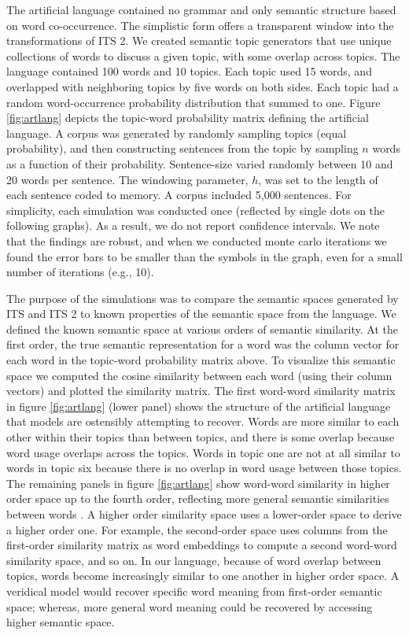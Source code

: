 \documentclass[10pt,letterpaper]{article}
\begin{document}
The artificial language contained no grammar and only semantic structure based on word co-occurrence. The simplistic form offers a transparent window into the transformations of ITS 2. We created semantic topic generators that use unique collections of words to discuss a given topic, with some overlap across topics. The language contained 100 words and 10 topics. Each topic used 15 words, and overlapped with neighboring topics by five words on both sides. Each topic had a random word-occurrence probability distribution that summed to one. Figure \ref{fig:artlang} depicts the topic-word probability matrix defining the artificial language. A corpus was generated by randomly sampling topics (equal probability), and then constructing sentences from the topic by sampling \(n\) words as a function of their probability. Sentence-size varied randomly between 10 and 20 words per sentence. The windowing parameter, $h$, was set to the length of each sentence coded to memory. A corpus included 5,000 sentences. For simplicity, each simulation was conducted once (reflected by single dots on the following graphs). As a result, we do not report confidence intervals. We note that the findings are robust, and when we conducted monte carlo iterations we found the error bars to be smaller than the symbols in the graph, even for a small number of iterations (e.g., 10). 

The purpose of the simulations was to compare the semantic spaces generated by ITS and ITS 2 to known properties of the semantic space from the language. We defined the known semantic space at various orders of semantic similarity. At the first order, the true semantic representation for a word was the column vector for each word in the topic-word probability matrix above. To visualize this semantic space we computed the cosine similarity between each word (using their column vectors) and plotted the similarity matrix. The first word-word similarity matrix in figure \ref{fig:artlang} (lower panel) shows the structure of the artificial language that models are ostensibly attempting to recover. Words are more similar to each other within their topics than between topics, and there is some overlap because word usage overlaps across the topics. Words in topic one are not at all similar to words in topic six because there is no overlap in word usage between those topics. The remaining panels in figure \ref{fig:artlang} show word-word similarity in higher order space up to the fourth order, reflecting more general semantic similarities between words \cite{kelly2013}. A higher order similarity space uses a lower-order space to derive a higher order one. For example, the second-order space uses columns from the first-order similarity matrix as word embeddings to compute a second word-word similarity space, and so on. In our language, because of word overlap between topics, words become increasingly similar to one another in higher order space. A veridical model would recover specific word meaning from first-order semantic space; whereas, more general word meaning could be recovered by accessing higher semantic space.
\end{document}
